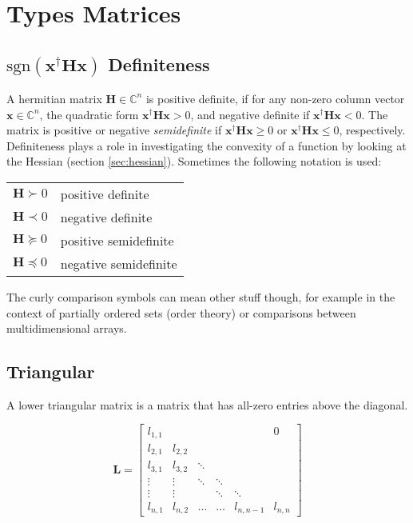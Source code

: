 \section{Types Matrices}

\subsection{$\mathrm{sgn}\left(\mathbf{x}^{\dagger}\mathbf{H}\mathbf{x}\right)$ Definiteness}
\label{sec:definiteness}

A hermitian matrix $\mathbf{H}\in\mathbb{C}^n$ is positive definite, if for any non-zero column vector $\mathbf{x}\in\mathbb{C}^n$, the quadratic form $\mathbf{x}^{\dagger}\mathbf{H}\mathbf{x} > 0$, and negative definite if $\mathbf{x}^{\dagger}\mathbf{H}\mathbf{x} < 0$. The matrix is positive or negative \textit{semidefinite} if  $\mathbf{x}^{\dagger}\mathbf{H}\mathbf{x} \geq 0$ or $\mathbf{x}^{\dagger}\mathbf{H}\mathbf{x} \leq 0$, respectively. Definiteness plays a role in investigating the convexity of a function by looking at the Hessian (section \ref{sec:hessian}). Sometimes the following notation is used:

\begin{tabular}{ll}
$\mathbf{H} \succ 0$ & positive definite\\
$\mathbf{H} \prec 0$ & negative definite\\
$\mathbf{H} \succeq 0$ & positive semidefinite\\
$\mathbf{H} \preceq 0$ & negative semidefinite
\centering
\end{tabular}

The curly comparison symbols can mean other stuff though, for example in the context of partially ordered sets (order theory) or comparisons between multidimensional arrays.

\subsection{Triangular}
A lower triangular matrix is a matrix that has all-zero entries above the diagonal.

\begin{equation}
\mathbf{L} = \left[\begin{array}{cccccc} l_{1,1}&&&&&0\\l_{2,1}&l_{2,2}&&&&\\l_{3,1}&l_{3,2}&\ddots&&&\\  \vdots&\vdots&\ddots&\ddots&&\\ \vdots&\vdots&&\ddots&\ddots&\\  l_{n,1}&l_{n,2}&\hdots&\hdots&l_{n,n-1}&l_{n,n}\end{array}\right]
\end{equation}

